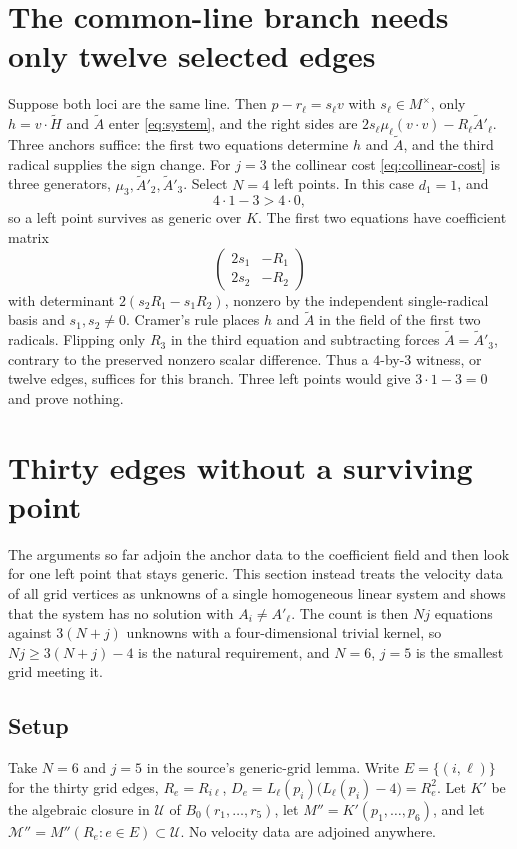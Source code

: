\documentclass[11pt]{article}
\theoremstyle{remark}
\begin{document}
\section{The common-line branch needs only twelve selected edges}
\label{sec:common-line}
Suppose both loci are the same line. Then $p-r_\ell=s_\ell v$ with
$s_\ell\in M^\times$, only $h=v\cdot\widetilde H$ and $\widetilde A$
enter \eqref{eq:system}, and the right sides are
$2s_\ell\mu_\ell(v\cdot v)-R_\ell\widetilde A'_\ell$. Three anchors
suffice: the first two equations determine $h$ and $\widetilde A$, and
the third radical supplies the sign change. For $j=3$ the collinear
cost \eqref{eq:collinear-cost} is three generators,
$\mu_3,\widetilde A'_2,\widetilde A'_3$. Select $N=4$ left points. In
this case $d_1=1$, and
\[
 4\cdot1-3>4\cdot0 ,
\]
so a left point survives as generic over $K$. The first two equations
have coefficient matrix
\[
 \begin{pmatrix}2s_1&-R_1\\2s_2&-R_2\end{pmatrix}
\]
with determinant $2(s_2R_1-s_1R_2)$, nonzero by the independent
single-radical basis and $s_1,s_2\ne0$. Cramer's rule places $h$ and
$\widetilde A$ in the field of the first two radicals. Flipping only
$R_3$ in the third equation and subtracting forces
$\widetilde A=\widetilde A'_3$, contrary to the preserved nonzero
scalar difference. Thus a $4$-by-$3$ witness, or twelve edges, suffices
for this branch. Three left points would give $3\cdot1-3=0$ and prove
nothing.

\section{Thirty edges without a surviving point}
\label{sec:joint}
The arguments so far adjoin the anchor data to the coefficient field
and then look for one left point that stays generic. This section
instead treats the velocity data of all grid vertices as unknowns of a
single homogeneous linear system and shows that the system has no
solution with $A_i\ne A'_\ell$. The count is then $Nj$ equations
against $3(N+j)$ unknowns with a four-dimensional trivial kernel, so
$Nj\ge3(N+j)-4$ is the natural requirement, and $N=6$, $j=5$ is the
smallest grid meeting it.

\subsection{Setup}
Take $N=6$ and $j=5$ in the source's generic-grid lemma. Write
$E=\{(i,\ell)\}$ for the thirty grid edges, $R_e=R_{i\ell}$,
$D_e=L_\ell(p_i)\bigl(L_\ell(p_i)-4\bigr)=R_e^2$. Let $K'$ be the
algebraic closure in $\mathcal U$ of $B_0(r_1,\ldots,r_5)$, let
$M''=K'(p_1,\ldots,p_6)$, and let
$\mathcal M''=M''(R_e:e\in E)\subset\mathcal U$. No velocity data are
adjoined anywhere.
\end{document}
